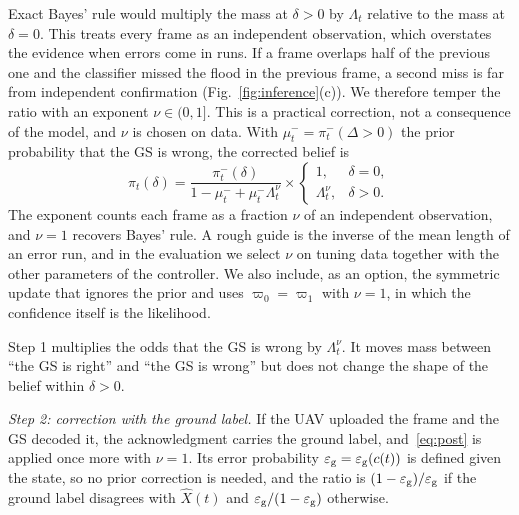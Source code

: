 \documentclass[journal]{IEEEtran}
\theoremstyle{remark}
\newcommand{\ee}{\varepsilon}
\begin{document}
Exact Bayes' rule would multiply the mass at $\delta>0$ by $\Lambda_t$ relative to the mass at $\delta=0$. This treats every frame as an independent observation, which overstates the evidence when errors come in runs. If a frame overlaps half of the previous one and the classifier missed the flood in the previous frame, a second miss is far from independent confirmation (Fig.~\ref{fig:inference}(c)). We therefore temper the ratio with an exponent $\nu\in(0,1]$. This is a practical correction, not a consequence of the model, and $\nu$ is chosen on data. With $\mu^-_t=\pi^-_t(\Delta>0)$ the prior probability that the GS is wrong, the corrected belief is
\begin{equation}\label{eq:post}
\pi_t(\delta)=\frac{\pi^-_t(\delta)}{1-\mu^-_t+\mu^-_t\Lambda_t^{\nu}}\times\begin{cases}1, & \delta=0,\\ \Lambda_t^{\nu}, & \delta>0.\end{cases}
\end{equation}
The exponent counts each frame as a fraction $\nu$ of an independent observation, and $\nu=1$ recovers Bayes' rule. A rough guide is the inverse of the mean length of an error run, and in the evaluation we select $\nu$ on tuning data together with the other parameters of the controller. We also include, as an option, the symmetric update that ignores the prior and uses $\varpi_0=\varpi_1$ with $\nu=1$, in which the confidence itself is the likelihood.

Step 1 multiplies the odds that the GS is wrong by $\Lambda_t^{\nu}$. It moves mass between ``the GS is right'' and ``the GS is wrong'' but does not change the shape of the belief within $\delta>0$.

\emph{Step 2: correction with the ground label.} If the UAV uploaded the frame and the GS decoded it, the acknowledgment carries the ground label, and~\eqref{eq:post} is applied once more with $\nu=1$. Its error probability $\ee_{\rm g}=\ee_{\rm g}(c(t))$ is defined given the state, so no prior correction is needed, and the ratio is $(1-\ee_{\rm g})/\ee_{\rm g}$ if the ground label disagrees with $\hat X(t)$ and $\ee_{\rm g}/(1-\ee_{\rm g})$ otherwise.
\end{document}
